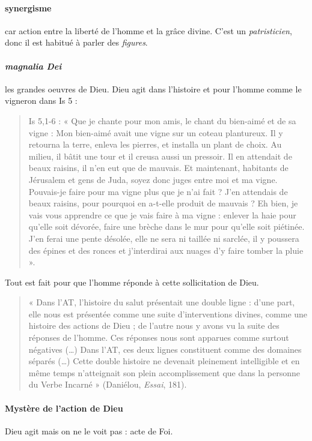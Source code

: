 \paragraph{synergisme} car action entre la liberté de l'homme et la grâce divine. C'est un \textit{patristicien}, donc il est habitué à parler des \textit{figures}.

\paragraph{\textit{magnalia Dei}} les grandes oeuvres de Dieu. Dieu agit dans l'histoire et pour l'homme comme le vigneron dans Is 5 : 
\begin{quote}
    Is 5,1-6 : « Que je chante pour mon amis, le chant du bien-aimé et de sa vigne : Mon bien-aimé avait une vigne sur un coteau plantureux. Il y retourna la terre, enleva les pierres, et installa un plant de choix. Au milieu, il bâtit une tour et il creusa aussi un pressoir. Il en attendait de beaux raisins,  il n’en eut que de mauvais. Et maintenant, habitants de Jérusalem et gens de Juda, soyez donc juges entre moi et ma vigne. Pouvais-je faire pour ma vigne plus que je n’ai fait ? J’en attendais de beaux raisins, pour pourquoi en a-t-elle produit de mauvais ? Eh bien, je vais vous apprendre ce que je vais faire à ma vigne : enlever la haie pour qu’elle soit dévorée, faire une brèche dans le mur pour qu’elle soit piétinée.  J’en ferai une pente désolée, elle ne sera ni taillée ni sarclée, il y poussera des épines et des ronces et j’interdirai aux nuages d’y faire tomber la pluie ». 
\end{quote}

Tout est fait pour que l'homme réponde à cette sollicitation de Dieu.

\begin{quote}
    « Dans l’AT, l’histoire du salut présentait une double ligne : d’une part, elle nous est présentée comme une suite d’interventions divines, comme une histoire des actions de Dieu ; de l’autre nous y avons vu la suite des réponses de l’homme. Ces réponses nous sont apparues comme surtout négatives (…) Dans l’AT, ces deux lignes constituent comme des domaines séparés (…) Cette double histoire ne devenait pleinement intelligible et en même temps n’atteignait son plein accomplissement que dans la personne du Verbe Incarné » (Daniélou, \textit{Essai}, 181). 
\end{quote}

\paragraph{Mystère de l'action de Dieu} Dieu agit mais on ne le voit pas : acte de Foi.

